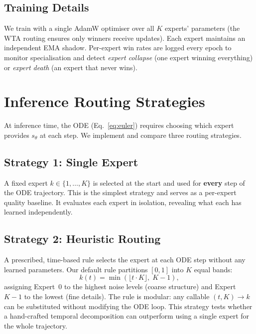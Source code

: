 \documentclass[11pt,a4paper]{article}
\begin{document}
\subsection{Training Details}

We train with a single AdamW optimiser over all $K$ experts' parameters
(the WTA routing ensures only winners receive updates). Each expert
maintains an independent EMA shadow. Per-expert win rates are logged every
epoch to monitor specialisation and detect \emph{expert collapse} (one
expert winning everything) or \emph{expert death} (an expert that never
wins).

\section{Inference Routing Strategies}
\label{sec:routing}

At inference time, the ODE (Eq.~\ref{eq:euler}) requires choosing which
expert provides $s_\theta$ at each step. We implement and compare three
routing strategies.

\subsection{Strategy 1: Single Expert}

A fixed expert $k \in \{1, \ldots, K\}$ is selected at the start and used
for \textbf{every} step of the ODE trajectory. This is the simplest
strategy and serves as a per-expert quality baseline. It evaluates each
expert in isolation, revealing what each has learned independently.

\subsection{Strategy 2: Heuristic Routing}

A prescribed, time-based rule selects the expert at each ODE step without
any learned parameters. Our default rule partitions $[0, 1]$ into $K$
equal bands:
\begin{equation}
  k(t) = \min\!\left(\lfloor t \cdot K \rfloor,\; K-1\right),
  \label{eq:heuristic}
\end{equation}
assigning Expert~0 to the highest noise levels (coarse structure) and
Expert~$K\!-\!1$ to the lowest (fine details). The rule is modular: any
callable $(t, K) \to k$ can be substituted without modifying the ODE loop.
This strategy tests whether a hand-crafted temporal decomposition can
outperform using a single expert for the whole trajectory.
\end{document}
